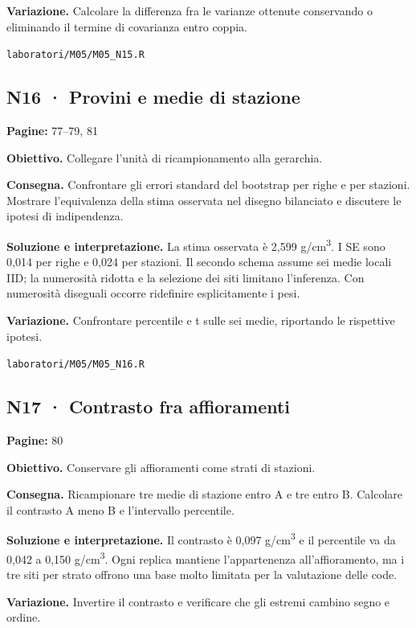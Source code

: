 \documentclass[11pt,a4paper]{article}
\begin{document}
\textbf{Variazione.} Calcolare la differenza fra le varianze ottenute conservando o eliminando il termine di covarianza entro coppia.

\texttt{laboratori/M05/M05\_N15.R}

\subsection*{N16 · Provini e medie di stazione}

\textbf{Pagine:} 77–79, 81

\textbf{Obiettivo.} Collegare l’unità di ricampionamento alla gerarchia.

\textbf{Consegna.} Confrontare gli errori standard del bootstrap per righe e per stazioni. Mostrare l’equivalenza della stima osservata nel disegno bilanciato e discutere le ipotesi di indipendenza.

\textbf{Soluzione e interpretazione.} La stima osservata è 2,599 g/cm\textsuperscript{3}. I SE sono 0,014 per righe e 0,024 per stazioni. Il secondo schema assume sei medie locali IID; la numerosità ridotta e la selezione dei siti limitano l’inferenza. Con numerosità diseguali occorre ridefinire esplicitamente i pesi.

\textbf{Variazione.} Confrontare percentile e t sulle sei medie, riportando le rispettive ipotesi.

\texttt{laboratori/M05/M05\_N16.R}

\newpage

\subsection*{N17 · Contrasto fra affioramenti}

\textbf{Pagine:} 80

\textbf{Obiettivo.} Conservare gli affioramenti come strati di stazioni.

\textbf{Consegna.} Ricampionare tre medie di stazione entro A e tre entro B. Calcolare il contrasto A meno B e l’intervallo percentile.

\textbf{Soluzione e interpretazione.} Il contrasto è 0,097 g/cm\textsuperscript{3} e il percentile va da 0,042 a 0,150 g/cm\textsuperscript{3}. Ogni replica mantiene l’appartenenza all’affioramento, ma i tre siti per strato offrono una base molto limitata per la valutazione delle code.

\textbf{Variazione.} Invertire il contrasto e verificare che gli estremi cambino segno e ordine.
\end{document}
